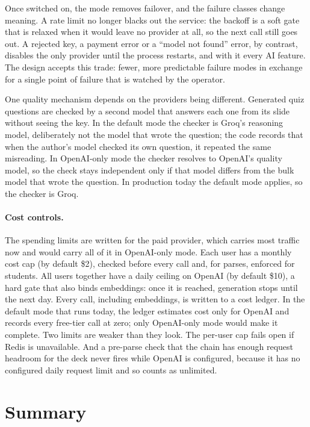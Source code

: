 Once switched on, the mode removes failover, and the failure classes change
meaning.
A rate limit no longer blacks out the service: the backoff is a soft gate that is
relaxed when it would leave no provider at all, so the next call still goes out.
A rejected key, a payment error or a ``model not found'' error, by contrast,
disables the only provider until the process restarts, and with it every AI
feature. The design accepts this trade: fewer, more
predictable failure modes in exchange for a single point of failure that is
watched by the operator.

One quality mechanism depends on the providers being different. Generated quiz
questions are checked by a second model that answers each one from its slide
without seeing the key. In the default mode the checker is Groq's reasoning model,
deliberately not the model that wrote the question; the code records that when
the author's model checked its own question, it repeated the same misreading. In
OpenAI-only mode the checker resolves to OpenAI's quality model, so the check
stays independent only if that model differs from the bulk model that wrote the
question. In production today the default mode applies, so the checker is Groq.

\paragraph{Cost controls.}
The spending limits are written for the paid provider, which carries most
traffic now and would carry all of it in OpenAI-only mode. Each
user has a monthly cost cap (by default \$2), checked before every call and, for
parses, enforced for students. All users together have a daily ceiling on
OpenAI (by default \$10), a hard gate that also binds embeddings: once it is
reached, generation stops until the next day. Every call, including embeddings,
is written to a cost ledger. In the default mode that runs today, the ledger
estimates cost only for OpenAI and records every free-tier call at zero; only
OpenAI-only mode would make it complete. Two limits are weaker than they look. The per-user cap fails open if Redis is unavailable.
And a pre-parse check that the chain has enough request headroom for the deck
never fires while OpenAI is configured, because it has no configured daily
request limit and so counts as unlimited.

\section{Summary}
\label{sec:design-summary}

